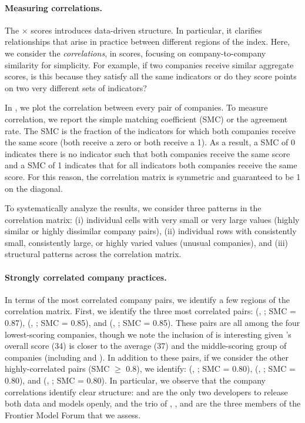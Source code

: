 \paragraph{Measuring correlations.}
The \numindicators $\times$ \numcompanies scores introduces data-driven structure.
In particular, it clarifies relationships that arise in practice between different regions of the index.
Here, we consider the \textit{correlations}, in scores, focusing on company-to-company similarity for simplicity.
For example, if two companies receive similar aggregate scores, is this because they satisfy all the same indicators or do they score points on two very different sets of indicators?

In , we plot the correlation between every pair of companies.
To measure correlation, we report the simple matching coefficient (SMC) or the agreement rate.
The SMC is the fraction of the \numindicators indicators for which both companies receive the same score (\ie both receive a zero or both receive a 1). 
As a result, a SMC of 0 indicates there is no indicator such that both companies receive the same score and a SMC of 1 indicates that for all indicators both companies receive the same score. 
For this reason, the correlation matrix is symmetric and guaranteed to be 1 on the diagonal. 

To systematically analyze the results, we consider three patterns in the correlation matrix:
(i) individual cells with very small or very large values (\ie highly similar or highly dissimilar company pairs),
(ii) individual rows with consistently small, consistently large, or highly varied values (\ie unusual companies),
and
(iii) structural patterns across the correlation matrix.

\paragraph{Strongly correlated company practices.}
In terms of the most correlated company pairs, we identify a few regions of the correlation matrix.
First, we identify the three most correlated pairs: 
(\cohere, \aitwentyone; SMC = 0.87),
(\aitwentyone, \amazon; SMC = 0.85),
and
(\inflection, \amazon; SMC = 0.85).
These pairs are all among the four lowest-scoring companies, though we note the inclusion of \cohere is interesting given \cohere's overall score (34) is closer to the average (37) and the middle-scoring group of companies (\ie including \google and \anthropic).
In addition to these pairs, if we consider the other highly-correlated pairs (SMC $\geq$ 0.8), we identify:
(\huggingface, \stability; SMC = 0.80),
(\openai, \anthropic; SMC = 0.80),
and
(\google, \anthropic; SMC = 0.80).
In particular, we observe that the company correlations identify clear structure: \huggingface and \stability are the only two developers to release both data and models openly, and the trio of \openai, \google, and \anthropic are the three members of the Frontier Model Forum that we assess.

